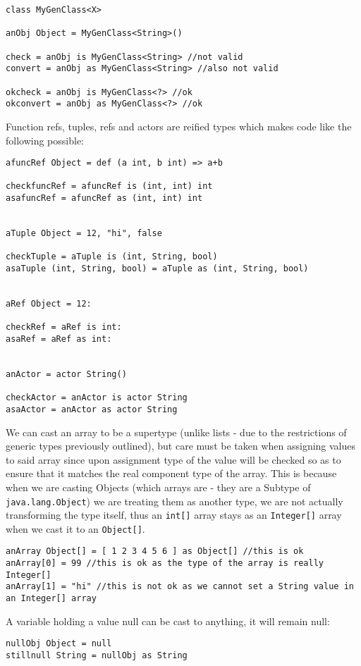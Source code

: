 \documentclass[conc-doc]{subfiles}
\begin{document}
\begin{lstlisting}
class MyGenClass<X>

anObj Object = MyGenClass<String>()

check = anObj is MyGenClass<String> //not valid
convert = anObj as MyGenClass<String> //also not valid

okcheck = anObj is MyGenClass<?> //ok
okconvert = anObj as MyGenClass<?> //ok
\end{lstlisting}

Function refs, tuples, refs and actors are reified types which makes code like the following possible:
\begin{lstlisting}
afuncRef Object = def (a int, b int) => a+b

checkfuncRef = afuncRef is (int, int) int
asafuncRef = afuncRef as (int, int) int


aTuple Object = 12, "hi", false

checkTuple = aTuple is (int, String, bool)
asaTuple (int, String, bool) = aTuple as (int, String, bool)


aRef Object = 12:

checkRef = aRef is int:
asaRef = aRef as int:


anActor = actor String()

checkActor = anActor is actor String
asaActor = anActor as actor String
\end{lstlisting}

We can cast an array to be a supertype (unlike lists - due to the restrictions of generic types previously outlined), but care must be taken when assigning values to said array since upon assignment type of the value will be checked so as to ensure that it matches the real component type of the array. This is because when we are casting Objects (which arrays are - they are a Subtype of \lstinline{java.lang.Object}) we are treating them as another type, we are not actually transforming the type itself, thus an \lstinline{int[]} array stays as an \lstinline{Integer[]} array when we cast it to an \lstinline{Object[]}.

\begin{lstlisting}
anArray Object[] = [ 1 2 3 4 5 6 ] as Object[] //this is ok
anArray[0] = 99 //this is ok as the type of the array is really Integer[]
anArray[1] = "hi" //this is not ok as we cannot set a String value in an Integer[] array
\end{lstlisting}

A variable holding a value null can be cast to anything, it will remain null:
\begin{lstlisting}
nullObj Object = null
stillnull String = nullObj as String
\end{lstlisting}
\end{document}
